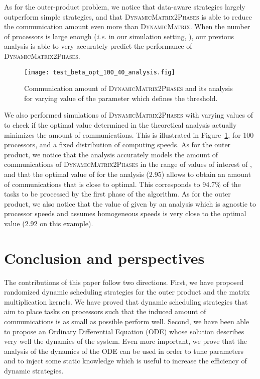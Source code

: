 \documentclass[a4paper,10pt]{article}
\newcommand{\ie}{{\it i.e.}\xspace}
\newcommand{\stupidmat}{\textsc{Dynamic\-Matrix}\xspace}
\newcommand{\stupidthresholdmat}{\textsc{Dynamic\-Matrix\-2Phases}\xspace}
\begin{document}
As for the outer-product problem, we notice that data-aware strategies
largely outperform simple strategies, and that \stupidthresholdmat is
able to reduce the communication amount even more than \stupidmat. When
the number of processors is large enough (\ie in our simulation
setting, ), our previous analysis is able to very accurately
predict the performance of \stupidthresholdmat.



\begin{figure}[htbp]
  \centering
  \texttt{[image: test\_beta\_opt\_100\_40\_analysis.fig]}
  \caption{Communication amount of \stupidthresholdmat and its
    analysis for varying value of the  parameter which defines
    the threshold.}
  \label{fig.betamat}
\end{figure}

We also performed simulations of \stupidthresholdmat with varying values
of  to check if the optimal value determined in the theoretical analysis actually
minimizes the amount of communications. This is illustrated in
Figure~\ref{fig.betamat}, for 100 processors,  and a fixed
distribution of computing speeds. As for the outer product, we notice
that the analysis accurately models the amount of communications of
\stupidthresholdmat in the range of values of interest of , and
that the optimal value of  for the analysis (2.95) allows to
obtain an amount of communications that is close to optimal. This
corresponds to 94.7\% of the tasks to be processed by the first phase
of the algorithm.  As for the outer product, we also notice that the
value of  given by an analysis which is agnostic to processor
speeds and assumes homogeneous speeds is very close to the optimal
value (2.92 on this example).


\section{Conclusion and perspectives}
\label{conclusion}

The contributions of this paper follow two directions. First, we have
proposed randomized dynamic scheduling strategies for the outer
product and the matrix multiplication kernels. We have proved that
dynamic scheduling strategies that aim to place tasks on processors
such that the induced amount of communications is as small as possible
perform well. Second, we have been able to propose an Ordinary
Differential Equation (ODE) whose solution describes very well the dynamics
of the system. Even more important, we prove that the analysis of the
dynamics of the ODE can be used in order to tune parameters and to inject
some static knowledge which is useful to increase the efficiency of
dynamic strategies.
\end{document}
